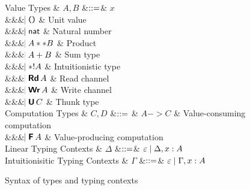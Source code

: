 \documentclass{llncs}
\begin{document}
\begin{figure}[htbp]
  \centering

\begin{grammar}
  Value Types
  & $A,B$
      &$\mathrel{::=}$&
      $x$
      \\ &&& $\bnfaltbrk \unitexp$ & Unit value
      \\ &&& $\hspace{-1.02ex}\mathrel{\mid} \mathsf{nat}$         & Natural number
      \\ &&& $\hspace{-1.02ex}\mathrel{\mid} A ** B$ & Product
      \\ &&& $\hspace{-1.02ex}\mathrel{\mid} A + B$ & Sum type
      \\ &&& $\hspace{-1.02ex}\mathrel{\mid} *! A$ & Intuitionistic type
      \\ &&& $\bnfaltbrk \Rd A$ & Read channel
      \\ &&& $\bnfaltbrk \Wr A$ & Write channel
      \\ &&& $\bnfaltbrk \U C$ & Thunk type
  \\[1ex]
  Computation Types
  & $C, D$
      &$\mathrel{::=}$ & 
             $A -> C$ & Value-consuming computation
      \\ &&& $\bnfaltbrk \F A$ & Value-producing computation
  \\[1ex]
  Linear Typing Contexts
  & $\Delta$
     &$\mathrel{::=}$& $\varepsilon \mathrel{\mid} \Delta,x:A$
  \\
  Intuitionisitic Typing Contexts
  & $\Gamma$
     &$\mathrel{::=}$& $\varepsilon \mathrel{\mid} \Gamma,x:A$
\end{grammar}

  \caption{Syntax of types and typing contexts}
  \label{fig:expr}
\end{figure}
\end{document}

